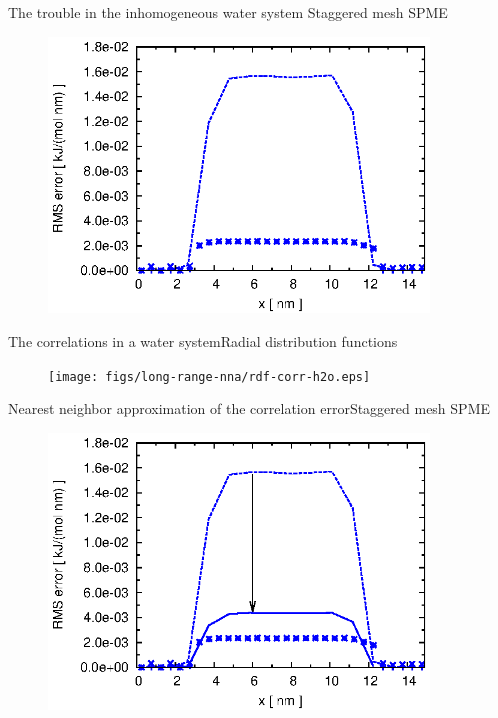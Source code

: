 \documentclass{beamer}
\begin{document}
\begin{frame}{The trouble in the inhomogeneous water system}
  {Staggered mesh SPME}
  \begin{figure}
    \centering
    \includegraphics[width=0.9\textwidth]{figs/long-range-inhomo/water-st-error-1.eps}
  \end{figure}  
\end{frame}

\begin{frame}{The correlations in a water system}{Radial distribution functions}
  \begin{figure}
    \centering
    \texttt{[image: figs/long-range-nna/rdf-corr-h2o.eps]}
  \end{figure}
\end{frame}


\begin{frame}{Nearest neighbor approximation of the correlation error}{Staggered mesh SPME}
  \begin{figure}
    \centering
    \includegraphics[width=0.9\textwidth]{figs/long-range-inhomo/water-st-error-2.eps}
  \end{figure}  
\end{frame}
\end{document}
